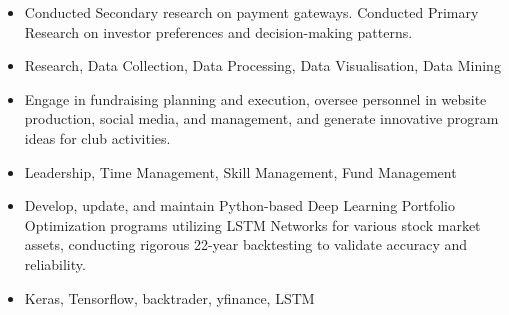 \documentclass[10pt,a4paper,ragged2e,withhyper]{altacv}
\begin{document}
\begin{paracol}{2}


\begin{itemize}
\item Conducted Secondary research on payment gateways. Conducted Primary Research on investor preferences and decision-making patterns.
\item Research, Data Collection, Data Processing, Data Visualisation, Data Mining

\end{itemize}

\begin{itemize}
\item Engage in fundraising planning and execution, oversee personnel in website production, social media, and management, and generate innovative program ideas for club activities.
\item Leadership, Time Management, Skill Management, Fund Management
\end{itemize}







\begin{itemize}
\item Develop, update, and maintain Python-based Deep Learning Portfolio Optimization programs utilizing LSTM Networks for various stock market assets, conducting rigorous 22-year backtesting to validate accuracy and reliability.
\item Keras, Tensorflow, backtrader, yfinance, LSTM
\end{itemize}


\end{paracol}
\end{document}
